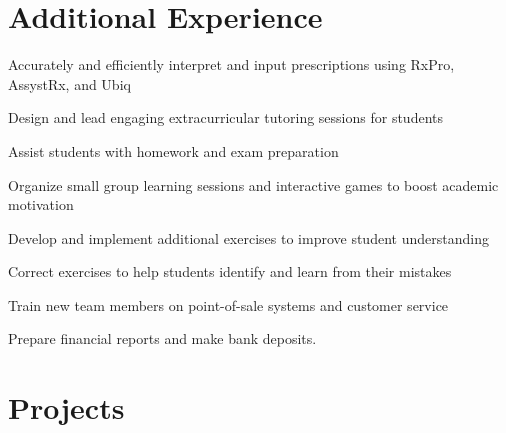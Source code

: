 \documentclass[letterpaper,10pt]{article}
\begin{document}
   \section{Additional Experience}

  \begin{resume_list}
    \item Accurately and efficiently interpret and input prescriptions using RxPro, AssystRx, and Ubiq
  \end{resume_list}

  \begin{resume_list}
    \item Design and lead engaging extracurricular tutoring sessions for students
    \item Assist students with homework and exam preparation
    \item Organize small group learning sessions and interactive games to boost academic motivation
    \item Develop and implement additional exercises to improve student understanding
    \item Correct exercises to help students identify and learn from their mistakes
  \end{resume_list}

  \begin{resume_list}
    \item Train new team members on point-of-sale systems and customer service
    \item Prepare financial reports and make bank deposits.
  \end{resume_list}

  \pagebreak


  \section{Projects}
\end{document}
